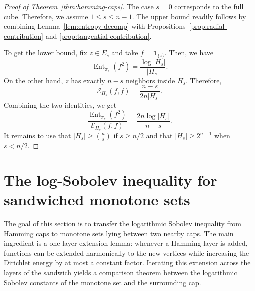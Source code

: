 \documentclass[12pt,final]{amsart}
\newcommand{\1}{\mathbf{1}}
\newcommand{\Ent}{\operatorname{Ent}}
\newcommand{\Ecal}{\mathcal{E}}
\begin{document}
\begin{proof}[Proof of Theorem~\ref{thm:hamming-caps}]
The case $s=0$ corresponds to the full cube. Therefore, we assume $1\leq s\leq n-1$. The upper bound readily follows by combining Lemma~\ref{lem:entropy-decomp} with Propositions~\ref{prop:radial-contribution} and \ref{prop:tangential-contribution}. 


To get the lower bound, fix $z\in E_s$ and take $f=\mathbf 1_{\{z\}}$. Then, we have 
$$
\Ent_{\pi_s}(f^2)=\frac{\log |H_s|}{|H_s|}. 
$$
On the other hand, $z$ has exactly $n-s$ neighbors inside $H_s$. Therefore, 
$$
\Ecal_{H_s}(f,f)= \frac{n-s}{2n |H_s|}. 
$$
Combining the two identities, we get 
$$
\frac{\Ent_{\pi_s}(f^2)}{\Ecal_{H_s}(f,f)}= \frac{2n\log |H_s|}{n-s}.
$$
It remains to use that $|H_s|\geq \binom{n}{s}$ if $s\geq n/2$ and that $|H_s|\geq 2^{n-1}$ when $s<n/2$. 
\end{proof}



\section{The log-Sobolev inequality for sandwiched monotone sets}\label{sec:LSI-sandwich}

The goal of this section is to transfer the logarithmic Sobolev inequality from Hamming caps to monotone sets lying between two nearby caps. The main ingredient is a one-layer extension lemma: whenever a Hamming layer is added, functions can be extended harmonically to the new vertices while increasing the Dirichlet energy by at most a constant factor. Iterating this extension across the layers of the sandwich yields a comparison theorem between the logarithmic Sobolev constants of the monotone set and the surrounding cap.
\end{document}
